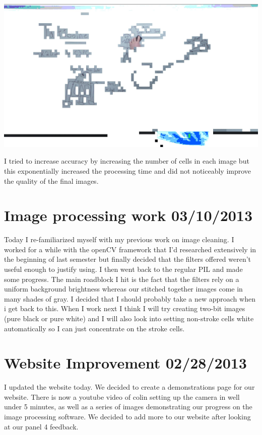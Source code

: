 \documentclass[]{article}
\begin{document}
	\includegraphics[scale=0.5]{images/Cells3.png}
	
	I tried to increase accuracy by increasing the number of cells in each image but this exponentially increased the processing time and did not noticeably improve the quality of the final images.
	
	\section{Image processing work 03/10/2013}
	
	Today I re-familiarized myself with my previous work on image cleaning. I worked for a while with the openCV framework that I'd researched extensively in the beginning of last semester but finally decided that the filters offered weren't useful enough to justify using. I then went back to the regular PIL and made some progress. The main roadblock I hit is the fact that the filters rely on a uniform background brightness whereas our stitched together images come in many shades of gray. I decided that I should probably take a new approach when i get back to this. When I work next I think I will try creating two-bit images (pure black or pure white) and I will also look into setting non-stroke cells white automatically so I can just concentrate on the stroke cells.
	
	
	\section{Website Improvement 02/28/2013}
	
	I updated the website today. We decided to create a demonstrations page for our website.
	There is now a youtube video of colin setting up the camera in well under 5 minutes, as well as a series of images demonstrating our progress on the image processing software. We decided to add more to our website after looking at our panel 4 feedback. 
	
\end{document}
